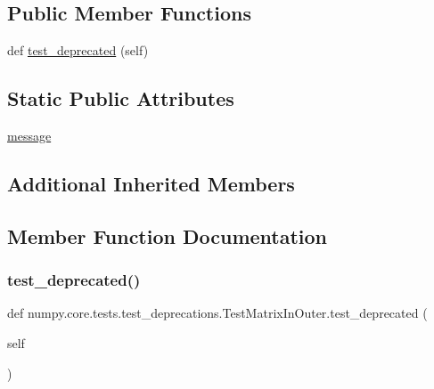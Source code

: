 \subsection*{Public Member Functions}
\begin{DoxyCompactItemize}
\item 
def \hyperlink{classnumpy_1_1core_1_1tests_1_1test__deprecations_1_1TestMatrixInOuter_a28f90c4657c016acf6ce65519bff13db}{test\+\_\+deprecated} (self)
\end{DoxyCompactItemize}
\subsection*{Static Public Attributes}
\begin{DoxyCompactItemize}
\item 
\hyperlink{classnumpy_1_1core_1_1tests_1_1test__deprecations_1_1TestMatrixInOuter_a9af00fcf6668b144497420d255525753}{message}
\end{DoxyCompactItemize}
\subsection*{Additional Inherited Members}


\subsection{Member Function Documentation}
\mbox{\label{classnumpy_1_1core_1_1tests_1_1test__deprecations_1_1TestMatrixInOuter_a28f90c4657c016acf6ce65519bff13db}} 
\subsubsection{\texorpdfstring{test\+\_\+deprecated()}{test\_deprecated()}}
{\footnotesize\ttfamily def numpy.\+core.\+tests.\+test\+\_\+deprecations.\+Test\+Matrix\+In\+Outer.\+test\+\_\+deprecated (\begin{DoxyParamCaption}\item[{}]{self }\end{DoxyParamCaption})}



